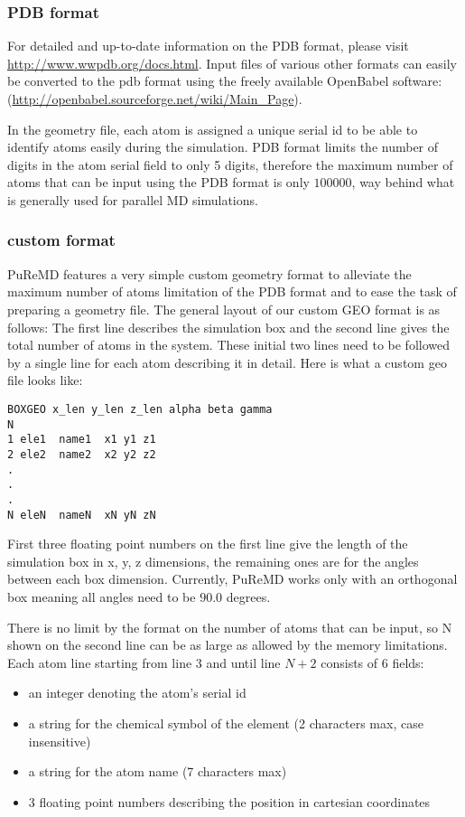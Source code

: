 \documentclass{article}
\begin{document}
\subsubsection{PDB format}
\label{sec:puremd_pdb}

For detailed and up-to-date information on the PDB format, please visit 
\url{http://www.wwpdb.org/docs.html}. Input files of various other formats 
can easily be converted to the pdb format using the freely available 
OpenBabel software: (\url{http://openbabel.sourceforge.net/wiki/Main_Page}).

In the geometry file, each atom is assigned a unique serial id to be
able to identify atoms easily during the simulation. PDB format limits the 
number of digits in the atom serial field to only 5 digits, therefore the 
maximum number of atoms that can be input using the PDB format is only 
$100000$, way behind what is generally used for parallel MD simulations.

\subsubsection{custom format}
\label{sec:puremd_custom}

PuReMD features a very simple custom geometry format to alleviate the 
maximum number of atoms limitation of the PDB format and to ease the task of
preparing a geometry file. The general layout of our custom GEO format is as
follows: The first line describes the simulation box and the second line 
gives the total number of atoms in the system. These initial two lines need 
to be followed by a single line for each atom describing it in detail. 
Here is what a custom geo file looks like:
\begin{verbatim}
BOXGEO x_len y_len z_len alpha beta gamma
N
1 ele1  name1  x1 y1 z1
2 ele2  name2  x2 y2 z2
.
.
.
N eleN  nameN  xN yN zN 
\end{verbatim}

First three floating point numbers on the first line give the length of 
the simulation box in x, y, z dimensions, the remaining ones are for the 
angles between each box dimension. Currently, PuReMD works only with an 
orthogonal box meaning all angles need to be $90.0$ degrees. 

There is no limit by the format on the number of atoms that can be input, 
so N shown on the second line can be as large as allowed by the memory
limitations. Each atom line starting from line 3 and until line $N+2$ consists 
of 6 fields: 
\begin{itemize}
  \item an integer denoting the atom's serial id
  \item a string for the chemical symbol of the element 
    (2 characters max, case insensitive)
  \item a string for the atom name (7 characters max)
  \item 3 floating point numbers describing the position in cartesian 
    coordinates
\end{itemize}
\end{document}
